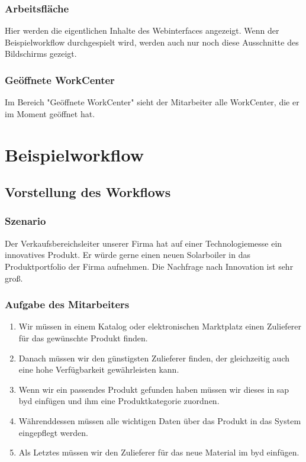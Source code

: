 \subsubsection{Arbeitsfläche}

Hier werden die eigentlichen Inhalte des Webinterfaces angezeigt. Wenn der Beispielworkflow durchgespielt wird, werden auch nur noch diese Ausschnitte des Bildschirms gezeigt.

\subsubsection{Geöffnete WorkCenter}

Im Bereich "Geöffnete WorkCenter" sieht der Mitarbeiter alle WorkCenter, die er im Moment geöffnet hat.

\section{Beispielworkflow}

\subsection{Vorstellung des Workflows}
\label{sec:byd-bsp-vorstellung}

\subsubsection{Szenario}

Der Verkaufsbereichsleiter unserer Firma hat auf einer Technologiemesse ein innovatives Produkt. Er würde gerne einen neuen Solarboiler in das Produktportfolio der Firma aufnehmen. Die Nachfrage nach Innovation ist sehr groß.

\subsubsection{Aufgabe des Mitarbeiters}

\begin{enumerate}
 \item Wir müssen in einem Katalog oder elektronischen Marktplatz einen Zulieferer für das gewünschte Produkt finden.
 \item Danach müssen wir den günstigsten Zulieferer finden, der gleichzeitig auch eine hohe Verfügbarkeit gewährleisten kann.
 \item Wenn wir ein passendes Produkt gefunden haben müssen wir dieses in \gls{sap} \gls{byd} einfügen und ihm eine Produktkategorie zuordnen.
 \item Währenddessen müssen alle wichtigen Daten über das Produkt in das System eingepflegt werden.
 \item Als Letztes müssen wir den Zulieferer für das neue Material im \gls{byd} einfügen.
 \end{enumerate}

